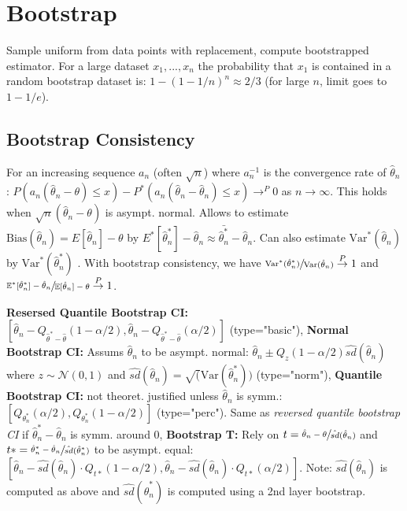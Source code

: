 \section*{Bootstrap}
Sample uniform from data points with replacement, compute bootstrapped estimator. 
For a large dataset $x_1, ..., x_n$ the probability that $x_1$ is contained in a random bootstrap dataset is:
$1-(1-1/n)^n \approx 2/3$ (for large $n$, limit goes to $1-1/e$).

\subsection*{Bootstrap Consistency}
For an increasing sequence $a_n$ (often $\sqrt{n}$) where $a_n^{-1}$ is the convergence rate of $\hat \theta_n$:
$P(a_n(\hat \theta_n - \theta) \leq x) - P^*(a_n(\hat \theta_n - \hat \theta_n) \leq x) \to^P 0$ as $n\to \infty$. 
This holds when $\sqrt{n}(\hat \theta_n - \theta)$ is asympt. normal. 
Allows to estimate $\text{Bias}(\hat \theta_n) = E[\hat \theta_n] - \theta$ by $E^*[\hat \theta^*_n] - \hat \theta_n \approx \bar{\hat{\theta}^*_n} - \hat{\theta}_n$. Can also estimate $\text{Var}^*(\hat\theta_n)$ by $\text{Var}^*(\hat\theta^*_n)$ .
With bootstrap consistency, we have $\sfrac{\textup{Var}^\ast(\hat\theta_n^\ast)}{\textup{Var}(\hat\theta_n)}\stackrel{P}{\rightarrow}1$ 
and $\sfrac{\mathbb{E}^\ast[\hat\theta_n^\ast]-\hat\theta_n}{\mathbb{E}[\hat\theta_n]-\theta}\stackrel{P}{\rightarrow}1$.

\textbf{Resersed Quantile Bootstrap CI:} $[\hat \theta_n - Q_{\hat \theta^* - \hat \theta}(1- \alpha / 2), \hat \theta_n - Q_{\hat \theta^* - \hat \theta}(\alpha / 2)]$ (type="basic"), \textbf{Normal Bootstrap CI:} Assums $\hat\theta_n$ to be asympt. normal: $\hat\theta_n \pm Q_z(1-\alpha / 2)\hat{sd}(\hat\theta_n)$ where $z \sim \mathcal{N}(0,1)$ and $\hat{sd}(\hat\theta_n)=\sqrt ({\text{Var}(\hat\theta_n^*)})$ (type="norm"), \textbf{Quantile Bootstrap CI:} not theoret. justified unless $\hat\theta_n$ is symm.:
$[Q_{\theta_n^*}(\alpha / 2), Q_{\theta_n^*}(1-\alpha / 2)]$ (type="perc"). 
Same as \textit{reversed quantile bootstrap CI} if $\hat\theta_n^* - \hat\theta_n$ is symm. around 0, 
\textbf{Bootstrap T:} Rely on $t=\sfrac{\hat\theta_n -\theta}{\hat {sd}(\hat\theta_n)}$ and $t*=\sfrac{\hat\theta_n^*-\hat\theta_n}{\hat{sd}(\hat\theta_n^*)}$ to be asympt. equal: 
$[\hat\theta_n - \hat{sd}(\hat\theta_n) \cdot Q_{t*}(1-\alpha / 2), \hat\theta_n - \hat{sd}(\hat\theta_n) \cdot Q_{t*}(\alpha / 2)]$. 
Note: $\hat{sd}(\hat\theta_n)$ is computed as above and $\hat{sd}(\hat\theta^*_n)$ is computed using a 2nd layer bootstrap.


